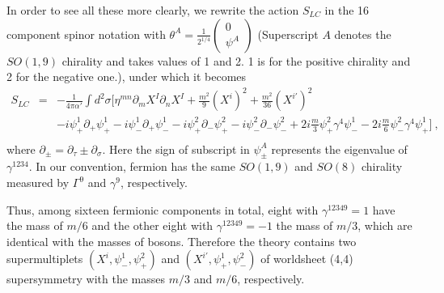 \documentclass[a4paper,12pt]{article}
\begin{document}
In order to see all these more 
clearly, we rewrite the action $S_{LC}$  in the 16 component
spinor notation with $\theta^A = \frac{1}{2^{1/4}} \left(
\begin{array}{c} 0 \\ \psi^A
\end{array} \right)$ (Superscript $A$ denotes the $SO(1,9)$
chirality and takes values of 1 and 2.  1 is for the positive
chirality and 2 for the negative one.), under which it becomes
\begin{eqnarray}
S_{LC}
 &=&  - \frac{1}{4 \pi \alpha'} \int  d^2 \sigma
 \Bigg[ \eta^{mn} \partial_m X^I \partial_n X^I 
      + \frac{m^2}{9} (X^i)^2
      + \frac{m^2}{36} (X^{i'})^2
                       \nonumber \\
 & & - i \psi_+^1 \partial_+  \psi^1_+
     - i \psi_-^1 \partial_+  \psi^1_-
     - i \psi^2_+ \partial_- \psi^2_+
     - i \psi^2_- \partial_- \psi^2_-
     +2i \frac{m}{3} \psi^2_+ \gamma^4 \psi^1_-
     - 2i \frac{m}{6} \psi^2_- \gamma^4 \psi^1_+
 \Bigg]~,
                       \nonumber \\
\label{lc-action}
\end{eqnarray}
where $\partial_\pm =\partial_\tau\pm \partial_\sigma$.  Here the sign
of subscript in $\psi^A_\pm$ represents the eigenvalue of
$\gamma^{1234}$.  In our convention, fermion has the same $SO(1,9)$
and $SO(8)$ chirality measured by $\Gamma^9$ and $\gamma^9$,
respectively.

Thus, among sixteen fermionic components in total, eight with
$\gamma^{12349}=1$ have the mass of $m/6$ and the other eight with
$\gamma^{12349}=-1$ the mass of $m/3$, which are identical with the
masses of bosons. Therefore the theory contains two supermultiplets
$(X^i, \psi^1_-, \psi^2_+)$ and $(X^{i'}, \psi^1_+, \psi^2_-)$ of
worldsheet (4,4) supersymmetry with the masses $m/3$ and $m/6$,
respectively.
\end{document}
